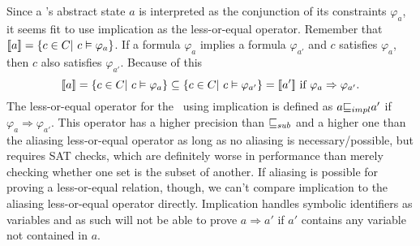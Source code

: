 Since a \constraintsCPA 's abstract state $a$ is interpreted as the conjunction of its constraints $\varphi_a$, it seems fit to use implication as the less-or-equal operator.
Remember that $\llbracket a \rrbracket = \{ c \in C |\ c \satisfies \varphi_a \}$.
If a formula $\varphi_a$ implies a formula $\varphi_{a'}$ and $c$ satisfies $\varphi_a$, then $c$ also satisfies $\varphi_{a'}$.
Because of this 
\[[\![ a ]\!] = \{ c \in C |\ c \vDash \varphi_a \} \subseteq \{ c \in C |\ c \vDash \varphi_{a'} \} = [\![ a' ]\!] \text{ if } \varphi_a \Rightarrow \varphi_{a'}.\]
The less-or-equal operator for the \constraintsCPA\ using implication is defined as $a {\sqsubseteq_{impl}} a'$ if $\varphi_a \Rightarrow \varphi_{a'}$.
This operator has a higher precision than ${\sqsubseteq_{sub}}$ and a higher one than the aliasing less-or-equal operator as long as no aliasing is necessary/possible, but requires SAT checks, which are definitely worse in performance than merely checking whether one set is the subset of another.
If aliasing is possible for proving a less-or-equal relation, though, we can't compare implication to the aliasing less-or-equal operator directly.
Implication handles symbolic identifiers as variables and as such will not be able to prove $a \Rightarrow a'$ if $a'$ contains any variable not contained in $a$.


